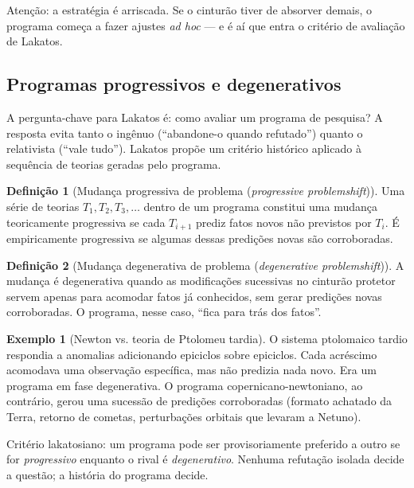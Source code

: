 \documentclass[9pt,a4paper]{extarticle}
\newcommand{\impt}[1]{\textcolor{important}{#1}}
\newcommand{\ntc}[1]{\textcolor{notice}{#1}}
\theoremstyle{definition}
\newtheorem{definition}{Definição}[section]
\newtheorem{example}{Exemplo}[section]
\begin{document}
\ntc{Atenção:} a estratégia é arriscada. Se o cinturão tiver de absorver demais, o programa começa a fazer ajustes \emph{ad hoc} --- e é aí que entra o critério de avaliação de Lakatos.

\subsection{Programas progressivos e degenerativos}

A pergunta-chave para Lakatos é: como \impt{avaliar} um programa de pesquisa? A resposta evita tanto o ingênuo (``abandone-o quando refutado'') quanto o relativista (``vale tudo''). Lakatos propõe um critério \impt{histórico} aplicado à sequência de teorias geradas pelo programa.

\begin{definition}[Mudança progressiva de problema (\emph{progressive problemshift})]
Uma série de teorias $T_1, T_2, T_3, \ldots$ dentro de um programa constitui uma mudança \impt{teoricamente progressiva} se cada $T_{i+1}$ \impt{prediz fatos novos} não previstos por $T_i$. É \impt{empiricamente progressiva} se algumas dessas predições novas são \impt{corroboradas}.
\end{definition}

\begin{definition}[Mudança degenerativa de problema (\emph{degenerative problemshift})]
A mudança é \impt{degenerativa} quando as modificações sucessivas no cinturão protetor servem apenas para \impt{acomodar} fatos já conhecidos, sem gerar predições novas corroboradas. O programa, nesse caso, ``fica para trás dos fatos''.
\end{definition}

\begin{example}[Newton vs. teoria de Ptolomeu tardia]
O sistema ptolomaico tardio respondia a anomalias adicionando epiciclos sobre epiciclos. Cada acréscimo acomodava uma observação específica, mas \impt{não predizia nada novo}. Era um programa em fase degenerativa. O programa copernicano-newtoniano, ao contrário, gerou uma sucessão de predições corroboradas (formato achatado da Terra, retorno de cometas, perturbações orbitais que levaram a Netuno).
\end{example}

\impt{Critério lakatosiano:} um programa pode ser provisoriamente preferido a outro se for \emph{progressivo} enquanto o rival é \emph{degenerativo}. Nenhuma refutação isolada decide a questão; a história do programa decide.
\end{document}
